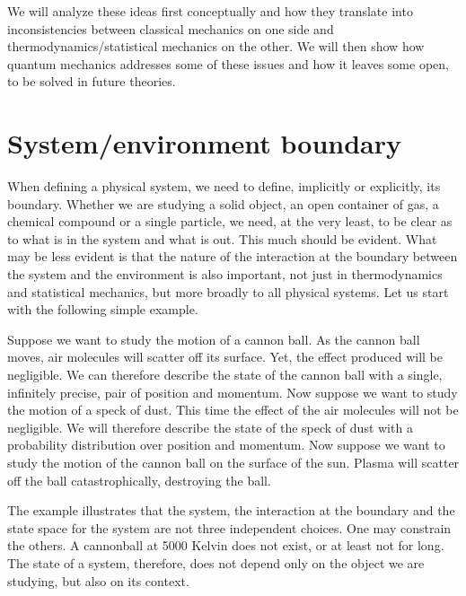 \documentclass[10pt,twocolumn, nofootinbib]{revtex4-2}
\begin{document}
We will analyze these ideas first conceptually and how they translate into inconsistencies between classical mechanics on one side and thermodynamics/statistical mechanics on the other. We will then show how quantum mechanics addresses some of these issues and how it leaves some open, to be solved in future theories.

\section{System/environment boundary}

When defining a physical system, we need to define, implicitly or explicitly, its boundary. Whether we are studying a solid object, an open container of gas, a chemical compound or a single particle, we need, at the very least, to be clear as to what is in the system and what is out. This much should be evident. What may be less evident is that the nature of the interaction at the boundary between the system and the environment is also important, not just in thermodynamics and statistical mechanics, but more broadly to all physical systems. Let us start with the following simple example.

Suppose we want to study the motion of a cannon ball. As the cannon ball moves, air molecules will scatter off its surface. Yet, the effect produced will be negligible. We can therefore describe the state of the cannon ball with a single, infinitely precise, pair of position and momentum. Now suppose we want to study the motion of a speck of dust. This time the effect of the air molecules will not be negligible. We will therefore describe the state of the speck of dust with a probability distribution over position and momentum. Now suppose we want to study the motion of the cannon ball on the surface of the sun. Plasma will scatter off the ball catastrophically, destroying the ball. 

The example illustrates that the system, the interaction at the boundary and the state space for the system are not three independent choices. One may constrain the others. A cannonball at 5000 Kelvin does not exist, or at least not for long. The state of a system, therefore, does not depend only on the object we are studying, but also on its context.
\end{document}
